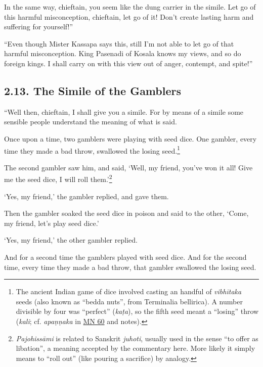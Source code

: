 \documentclass[12pt,openany]{book}%
\begin{document}
In the same way, chieftain, you seem like the dung carrier in the simile. Let go of this harmful misconception, chieftain, let go of it! Don’t create lasting harm and suffering for yourself!” 

“Even though Mister Kassapa says this, still I’m not able to let go of that harmful misconception. King Pasenadi of Kosala knows my views, and so do foreign kings. I shall carry on with this view out of anger, contempt, and spite!” 

\subsection*{2.13. The Simile of the Gamblers }

“Well then, chieftain, I shall give you a simile. For by means of a simile some sensible people understand the meaning of what is said. 

Once upon a time, two gamblers were playing with seed dice. One gambler, every time they made a bad throw, swallowed the losing seed.\footnote{The ancient Indian game of dice involved casting an handful of \textit{\textsanskrit{vibhītaka}} seeds (also known as “bedda nuts”, from Terminalia bellirica). A number divisible by four was “perfect” (\textit{\textsanskrit{kaṭa}}), so the fifth seed meant a “losing” throw (\textit{kali}; cf. \textit{\textsanskrit{apaṇṇaka}} in \href{https://suttacentral.net/mn60/en/sujato}{MN 60} and notes). } 

The second gambler saw him, and said, ‘Well, my friend, you’ve won it all! Give me the seed dice, I will roll them.’\footnote{\textit{\textsanskrit{Pajohissāmi}} is related to Sanskrit \textit{juhoti}, usually used in the sense “to offer as libation”, a meaning accepted by the commentary here. More likely it simply means to “roll out” (like pouring a sacrifice) by analogy. } 

‘Yes, my friend,’ the gambler replied, and gave them. 

Then the gambler soaked the seed dice in poison and said to the other, ‘Come, my friend, let’s play seed dice.’ 

‘Yes, my friend,’ the other gambler replied. 

And for a second time the gamblers played with seed dice. And for the second time, every time they made a bad throw, that gambler swallowed the losing seed. 
\end{document}
